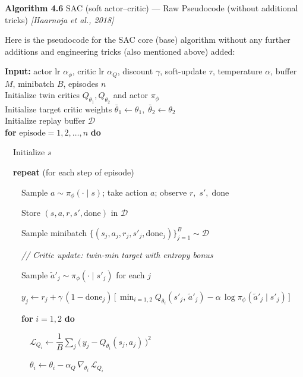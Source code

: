 \documentclass[11pt]{article}
\begin{document}
    \label{pseudo-4-6}

    \begin{pseudobox}

\textbf{Algorithm 4.6} SAC (soft actor--critic) --- Raw Pseudocode
(without additional tricks) \emph{{[}Haarnoja et al., 2018{]}}

\tcbline

Here is the pseudocode for the SAC core (base) algorithm without any
further additions and engineering tricks (also mentioned above) added:

\textbf{Input:} actor lr \(\alpha_\phi\), critic lr \(\alpha_Q\),
discount \(\gamma\), soft-update \(\tau\), temperature \(\alpha\),
buffer \(M\), minibatch \(B\), episodes \(n\)\\
Initialize twin critics \(Q_{\theta_1}, Q_{\theta_2}\) and actor
\(\pi_\phi\)\\
Initialize target critic weights
\(\bar{\theta}_1 \leftarrow \theta_1,\;\bar{\theta}_2 \leftarrow \theta_2\)\\
Initialize replay buffer \(\mathcal{D}\)\\
\textbf{for} \(\text{episode} = 1, 2, \ldots, n\) \textbf{do}\\
\strut ~~Initialize \(s\)\\
\strut ~~\textbf{repeat} (for each step of episode)\\
\strut ~~~~Sample \(a \sim \pi_\phi(\cdot \mid s)\); take action \(a\);
observe \(r,\; s',\; \text{done}\)\\
\strut ~~~~Store \((s, a, r, s', \text{done})\) in \(\mathcal{D}\)\\
\strut ~~~~Sample minibatch
\(\{(s_j, a_j, r_j, s'_j, \text{done}_j)\}_{j=1}^{B} \sim \mathcal{D}\)\\
\strut ~~~~\emph{// Critic update: twin-min target with entropy bonus}\\
\strut ~~~~Sample \(\tilde{a}'_j \sim \pi_\phi(\cdot \mid s'_j)\) for
each \(j\)\\
\strut ~~~~\(y_j \leftarrow r_j + \gamma\,(1 - \text{done}_j)\,\bigl[\, \min_{i = 1, 2} Q_{\bar{\theta}_i}(s'_j,\, \tilde{a}'_j) - \alpha\, \log \pi_\phi(\tilde{a}'_j \mid s'_j) \,\bigr]\)\\
\strut ~~~~\textbf{for} \(i = 1, 2\) \textbf{do}\\
\strut ~~~~~~\(\mathcal{L}_{Q_i} \leftarrow \dfrac{1}{B} \sum_j \bigl(\, y_j - Q_{\theta_i}(s_j, a_j) \,\bigr)^{2}\)\\
\strut ~~~~~~\(\theta_i \leftarrow \theta_i - \alpha_Q\, \nabla_{\theta_i}\, \mathcal{L}_{Q_i}\)\\

\end{pseudobox}
\end{document}
